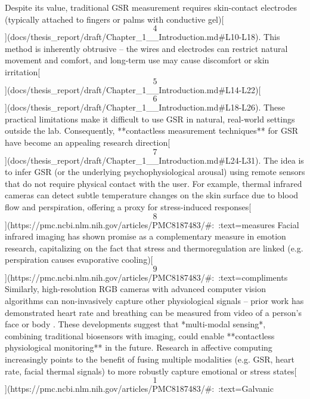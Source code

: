 \documentclass[12pt,a4paper]{article}
\begin{document}
Despite its value, traditional GSR measurement requires skin-contact
electrodes (typically attached to fingers or palms with conductive
gel)[\[4\]](docs/thesis_report/draft/Chapter_1__Introduction.md#L10-L18).
This method is inherently obtrusive -- the wires and electrodes can
restrict natural movement and comfort, and long-term use may cause
discomfort or skin
irritation[\[5\]](docs/thesis_report/draft/Chapter_1__Introduction.md#L14-L22)[\[6\]](docs/thesis_report/draft/Chapter_1__Introduction.md#L18-L26).
These practical limitations make it difficult to use GSR in natural,
real-world settings outside the lab. Consequently, **contactless
measurement techniques** for GSR have become an appealing research
direction[\[7\]](docs/thesis_report/draft/Chapter_1__Introduction.md#L24-L31).
The idea is to infer GSR (or the underlying psychophysiological arousal)
using remote sensors that do not require physical contact with the user.
For example, thermal infrared cameras can detect subtle temperature
changes on the skin surface due to blood flow and perspiration, offering
a proxy for stress-induced
responses[\[8\]](https://pmc.ncbi.nlm.nih.gov/articles/PMC8187483/#:~:text=measures%
Facial infrared imaging has shown promise as a complementary measure in
emotion research, capitalizing on the fact that stress and
thermoregulation are linked (e.g. perspiration causes evaporative
cooling)[\[9\]](https://pmc.ncbi.nlm.nih.gov/articles/PMC8187483/#:~:text=compliments%
Similarly, high-resolution RGB cameras with advanced computer vision
algorithms can non-invasively capture other physiological signals --
prior work has demonstrated heart rate and breathing can be measured
from video of a person's face or
body \citep{AppliedSciences2020AffectiveComputing, TechScience2021StressRecognition}.
These developments suggest that *multi-modal sensing*, combining
traditional biosensors with imaging, could enable **contactless
physiological monitoring** in the future. Research in affective
computing increasingly points to the benefit of fusing multiple
modalities (e.g. GSR, heart rate, facial thermal signals) to more
robustly capture emotional or stress
states[\[1\]](https://pmc.ncbi.nlm.nih.gov/articles/PMC8187483/#:~:text=Galvanic%
\end{document}
